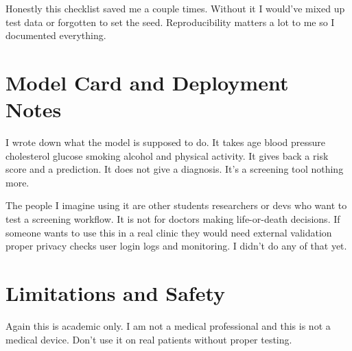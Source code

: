 \documentclass[12pt, a4paper, oneside]{book}
\begin{document}
Honestly this checklist saved me a couple times. Without it I would've mixed up test data or forgotten to set the seed. Reproducibility matters a lot to me so I documented everything.

\section{Model Card and Deployment Notes}
I wrote down what the model is supposed to do. It takes age blood pressure cholesterol glucose smoking alcohol and physical activity. It gives back a risk score and a prediction. It does not give a diagnosis. It's a screening tool nothing more.

The people I imagine using it are other students researchers or devs who want to test a screening workflow. It is not for doctors making life-or-death decisions. If someone wants to use this in a real clinic they would need external validation proper privacy checks user login logs and monitoring. I didn't do any of that yet.

\section{Limitations and Safety}
Again this is academic only. I am not a medical professional and this is not a medical device. Don't use it on real patients without proper testing.
\end{document}
